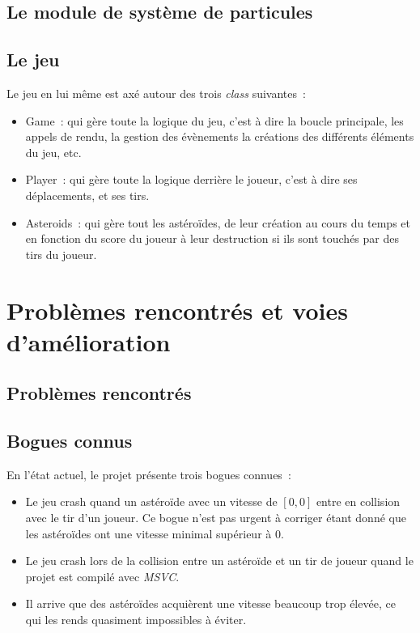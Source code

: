 \documentclass[10pt, french, a4paper]{report}
\newcommand{\class}[1]{{\codefont \NoAutoSpacing \mbox{#1}}}
\begin{document}
\section{Le module de système de particules}


\section{Le jeu}

Le jeu en lui même est axé autour des trois \textit{class} suivantes~:
\begin{itemize}
	\item \class{Game}~: qui gère toute la logique du jeu, c'est à dire la boucle
		  principale, les appels de rendu, la gestion des évènements la créations
		  des différents éléments du jeu, etc.
	\item \class{Player}~: qui gère toute la logique derrière le joueur, c'est à dire
		  ses déplacements, et ses tirs.
	\item \class{Asteroids}~: qui gère tout les astéroïdes, de leur création au cours
		  du temps et en fonction du score du joueur à leur destruction si ils sont
		  touchés par des tirs du joueur. 
\end{itemize}


\chapter{Problèmes rencontrés et voies d'amélioration}

\section{Problèmes rencontrés}


\section{Bogues connus}

En l'état actuel, le projet présente trois bogues connues~:
\begin{itemize}
	\item Le jeu \og crash \fg{} quand un astéroïde avec un vitesse de $[0, 0]$ entre en 
	      collision avec le tir d'un joueur. Ce bogue n'est pas urgent à corriger
	      étant donné que les astéroïdes ont une vitesse minimal supérieur à $0$.
	\item Le jeu \og crash \fg{} lors de la collision entre un astéroïde et un tir de
	      joueur quand le projet est compilé avec \textit{MSVC}.
	\item Il arrive que des astéroïdes acquièrent une vitesse beaucoup trop élevée, ce
	      qui les rends quasiment impossibles à éviter.
\end{itemize}
\end{document}
